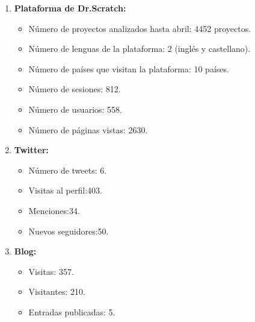 \documentclass[a4paper,12pt]{letter}
\begin{document}
\begin{letter}
\begin{enumerate}  
    \item {\textbf{Plataforma de Dr.Scratch:}}
        \begin{itemize}
            \item {Número de proyectos analizados hasta abril: 4452 proyectos.}
            \item {Número de lenguas de la plataforma: 2 (inglés y castellano).}
            \item {Número de países que visitan la plataforma: 10 países.}
            \item {Número de sesiones: 812.}
            \item {Número de usuarios: 558.}
            \item {Número de páginas vistas: 2630.}
        \end{itemize}
    \item {\textbf{Twitter:}}
        \begin{itemize}
            \item {Número de tweets: 6.}
            \item {Visitas al perfil:403.}
            \item {Menciones:34.}
            \item {Nuevos seguidores:50.}
        \end{itemize}
    \item {\textbf{Blog:}}
        \begin{itemize}
            \item {Visitas: 357.}
            \item {Visitantes: 210.}
            \item {Entradas publicadas: 5.}
        \end{itemize}

\end{enumerate}

\end{letter}
\end{document}
